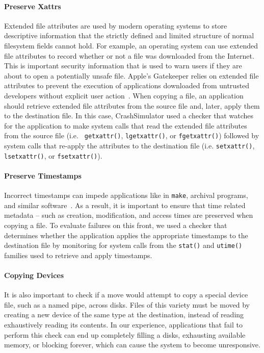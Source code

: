 \paragraph{Preserve Xattrs}

Extended file attributes
are used by modern operating systems
to store descriptive information
that the strictly defined and limited structure
of normal filesystem fields cannot hold.
For example,
an operating system can use extended file attributes
to record whether or not a file was downloaded from the Internet.
This is important security information
that is used to warn users
if they are about to open a potentially unsafe file.
Apple's Gatekeeper relies on extended file attributes
to prevent the execution of applications downloaded from
untrusted developers without explicit user action~\cite{AppleCodeSigning}.
When copying a file,
an application should retrieve extended file attributes from the source
file and, later, apply them to the destination file.
In this case, CrashSimulator used a checker
that watches for the application to make system calls
that read the extended file attributes from the source file (i.e. {\tt
  getxattr()}, {\tt lgetxattr()}, or {\tt fgetxattr()}) followed by system calls
that re-apply the attributes to the destination file (i.e. {\tt setxattr()},
{\tt lsetxattr()}, or {\tt fsetxattr()}).

\paragraph{Preserve Timestamps}

Incorrect timestamps can impede applications like
in {\tt make}, archival programs, and similar
software~\cite{NautilusTimestamps, SudoTimestamp}.
As a result, it is important to ensure
that time related metadata --
such as creation, modification, and access times
are preserved when copying a file.
To evaluate failures on this front,
we used a checker that determines
whether the application applies
the appropriate timestamps to the destination file
by monitoring for system calls from the {\tt stat()}
and {\tt utime()} families used to retrieve and apply timestamps.

\paragraph{Copying Devices}

It is also important to check if a move
would attempt to copy a special
device file, such as a named pipe, across disks.
Files of this variety must be moved
by creating a new device of the same type at the destination,
instead of reading exhaustively reading its contents.
In our experience, applications that fail to perform this check
can end up completely filling a disks, exhausting available memory,
or blocking forever, which can cause the system to become unresponsive.


